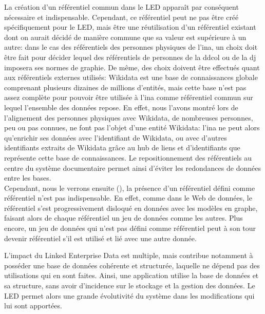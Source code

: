 La création d'un référentiel commun dans le LED apparaît par conséquent nécessaire et indispensable. Cependant, ce référentiel peut ne pas être créé spécifiquement pour le LED, mais être une réutilisation d'un référentiel existant dont on aurait décidé de manière commune que sa valeur est supérieure à un autre: dans le cas des référentiels des personnes physiques de l'\ac{ina}, un choix doit être fait pour décider lequel des référentiels de personnes de la \ac{ddcol} ou de la \ac{dj} imposera ses normes de graphie. De même, des choix doivent être effectués quant aux référentiels externes utilisés: Wikidata est une base de connaissances globale comprenant plusieurs dizaines de millions d'entités, mais cette base n'est pas assez complète pour pouvoir être utilisée à l'\ac{ina} comme référentiel commun sur lequel l'ensemble des données repose. En effet, nous l'avons montré lors de l'alignement des personnes physiques avec Wikidata, de nombreuses personnes, peu ou pas connues, ne font pas l'objet d'une entité Wikidata: l'\ac{ina} ne peut alors qu'enrichir ses données avec l'identifiant de Wikidata, ou avec d'autres identifiants extraits de Wikidata grâce au hub de liens et d'identifiants que représente cette base de connaissances. Le repositionnement des référentiels au centre du système documentaire permet ainsi d'éviter les redondances de données entre les bases.\\

Cependant, nous le verrons ensuite (), la présence d'un référentiel défini comme référentiel n'est pas indispensable. En effet, comme dans le Web de données, le référentiel s'est progressivement disloqué en données avec les modèles en graphe, faisant alors de chaque référentiel un jeu de données comme les autres. Plus encore, un jeu de données qui n'est pas défini comme référentiel peut à son tour devenir référentiel s'il est utilisé et lié avec une autre donnée.

\bigskip
\bigskip

L'impact du Linked Enterprise Data est multiple, mais contribue notamment à posséder une base de données cohérente et structurée, laquelle ne dépend pas des utilisations qui en sont faites. Ainsi, une application utilise la base de données et sa structure, sans avoir d'incidence sur le stockage et la gestion des données. Le LED permet alors une grande évolutivité du système dans les modifications qui lui sont apportées.